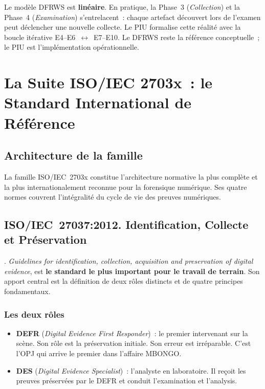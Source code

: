 Le modèle DFRWS est \textbf{linéaire}. En pratique, la Phase~3
(\textit{Collection}) et la Phase~4 (\textit{Examination}) s'entrelacent~:
chaque artefact découvert lors de l'examen peut déclencher une nouvelle
collecte. Le PIU formalise cette réalité avec la boucle itérative
E4--E6~$\leftrightarrow$~E7--E10. Le DFRWS reste la référence conceptuelle~;
le PIU est l'implémentation opérationnelle.

\section{La Suite ISO/IEC 2703x~: le Standard International de Référence}
\label{sec:iso-2703x}

\subsection{Architecture de la famille}

La famille ISO/IEC~2703x constitue l'architecture normative la plus complète
et la plus internationalement reconnue pour la forensique numérique. Ses
quatre normes couvrent l'intégralité du cycle de vie des preuves numériques.

\subsection{ISO/IEC~27037:2012. Identification, Collecte et Préservation}

. \textit{Guidelines for identification,
collection, acquisition and preservation of digital evidence},
est \textbf{le standard le plus important pour le travail de terrain}.
Son apport central est la définition de deux rôles distincts et de quatre
principes fondamentaux.

\subsubsection*{Les deux rôles}

\begin{itemize}
    \item \textbf{DEFR} (\textit{Digital Evidence First Responder})~:
          le premier intervenant sur la scène. Son rôle est la préservation
          initiale. Son erreur est irréparable. C'est l'OPJ qui arrive le
          premier dans l'affaire MBONGO.
    \item \textbf{DES} (\textit{Digital Evidence Specialist})~:
          l'analyste en laboratoire. Il reçoit les preuves préservées par
          le DEFR et conduit l'examination et l'analysis.
\end{itemize}

